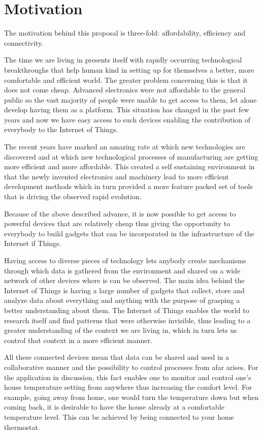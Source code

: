 \chapter*{Motivation}

\qquad The motivation behind this proposal is three-fold: affordability, efficiency and connectivity.

\qquad The time we are living in presents itself with rapidly occurring technological breakthroughs that help human
kind in setting up for themselves a better, more comfortable and efficient world. The greater problem concerning
this is that it does not come cheap. Advanced electronics were not affordable to the general public so the vast
majority of people were unable to get access to them, let alone develop  having them as a platform. This
situation has changed in the past few years and now we have easy access to such devices enabling the
contribution of everybody to the Internet of Things.

\qquad The recent years have marked an amazing rate at which new technologies are discovered and at which new
technological processes of manufacturing are getting more efficient and more affordable. This created a self
sustaining environment in that the newly invented electronics and machinery lead to more efficient
development methods which in turn provided a more feature packed set of tools that is driving the observed
rapid evolution.

Because of the above described advance, it is now possible to get access to powerful devices that are
relatively cheap thus giving the opportunity to everybody to build gadgets that can be incorporated
in the infrastructure of the Internet if Things.

\qquad Having access to diverse pieces of technology lets anybody create mechanisms through which data is gathered
from the environment and shared on a wide network of other devices where is can be observed.
The main idea behind the Internet of Things is having a large number of gadgets that collect, store and
analyze data about everything and anything with the purpose of grasping a better understanding about them.
The Internet of Things enables the world to research itself and find patterns that were otherwise invisible,
thus leading to a greater understanding of the context we are living in, which in turn lets us control that
context in a more efficient manner.

\qquad All these connected devices mean that data can be shared and used in a collaborative manner and the
possibility to control processes from afar arises. For the application in discussion, this fact enables one to
monitor and control one's house temperature setting from anywhere thus increasing the comfort level. For
example, going away from home, one would turn the temperature down but when coming back, it is desirable to
have the house already at a comfortable temperature level. This can be achieved by being connected to your
home thermostat.
